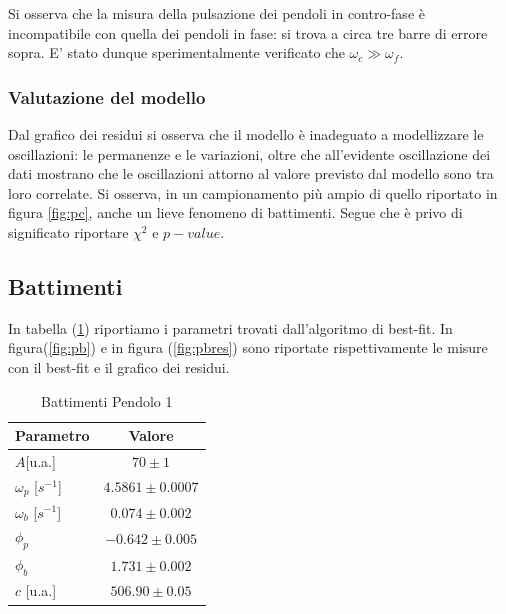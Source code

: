 \documentclass{article}
\begin{document}
            Si osserva che la misura della pulsazione dei pendoli in contro-fase è incompatibile con quella dei pendoli in fase: si trova a circa tre barre di errore sopra.
            E' stato dunque sperimentalmente verificato che $\omega_c \gg \omega_f$.
            
            \subsubsection{Valutazione del modello}
            
              Dal grafico dei residui si osserva che il modello è inadeguato a modellizzare le oscillazioni: le permanenze e le variazioni, oltre che all'evidente oscillazione dei dati mostrano che le oscillazioni attorno al valore previsto dal modello sono tra loro correlate.
             Si osserva, in un campionamento più ampio di quello  riportato in  figura \ref{fig:pc}, anche un lieve fenomeno di battimenti.
             Segue che è privo di significato riportare $\chi^2$ e $p-value$.
           
    
		\subsection{  Battimenti}
  
                In tabella (\ref{tab:pb}) riportiamo i parametri trovati dall'algoritmo di best-fit.
              In figura(\ref{fig:pb}) e in figura (\ref{fig:pbres}) sono riportate rispettivamente  le misure con il best-fit e il grafico dei residui. 
                \begin{table}[h! ]
                    \centering
                    \caption{Battimenti Pendolo 1}
                    \begin{tabular}{|l|c|}
                    \hline
                    Parametro & Valore \\
                    \hline
                    $A$[u.a.] & $ 70 \pm 1$ \\
                    $\omega_p$ [$s^{-1}$]& $4.5861 \pm 0.0007$ \\
                    $\omega_b$ [$s^{-1}$] & $0.074 \pm 0.002$ \\
                    $\phi_p$ & $-0.642 \pm 0.005$ \\
                    $\phi_b$ & $1.731 \pm 0.002$ \\
                    $c$ [u.a.] & $506.90 \pm 0.05$ \\
                    \hline
                    
                    \end{tabular}
                    \label{tab:pb}
                \end{table}
\end{document}
